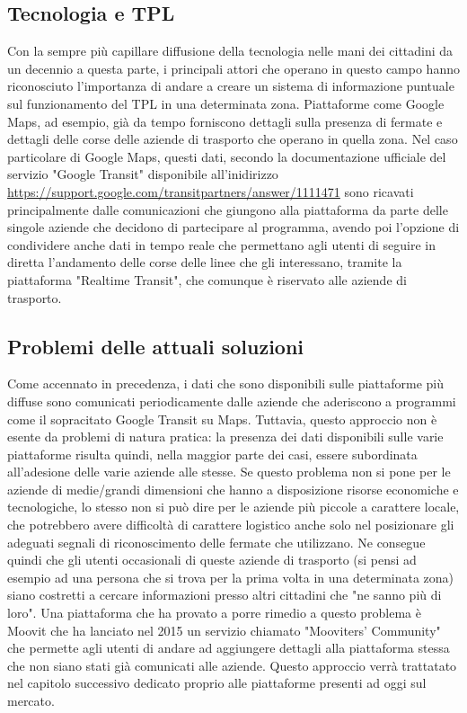     \subsection{Tecnologia e TPL}
    Con la sempre più capillare diffusione della tecnologia nelle mani dei cittadini da un decennio a questa parte, i principali attori che operano in questo campo hanno riconosciuto l'importanza di andare a creare un sistema di informazione puntuale sul funzionamento del TPL in una determinata zona. Piattaforme come Google Maps, ad esempio, già da tempo forniscono dettagli sulla presenza di fermate e dettagli delle corse delle aziende di trasporto che operano in quella zona. 
    Nel caso particolare di Google Maps, questi dati, secondo la documentazione ufficiale del servizio "Google Transit" disponibile all'inidirizzo \url{https://support.google.com/transitpartners/answer/1111471} sono ricavati principalmente dalle comunicazioni che giungono alla piattaforma da parte delle singole aziende che decidono di partecipare al programma, avendo poi l'opzione di condividere anche dati in tempo reale che permettano agli utenti di seguire in diretta l'andamento delle corse delle linee che gli interessano, tramite la piattaforma "Realtime Transit", che comunque è riservato alle aziende di trasporto.

    \subsection{Problemi delle attuali soluzioni}
    Come accennato in precedenza, i dati che sono disponibili sulle piattaforme più diffuse sono comunicati periodicamente dalle aziende che aderiscono a programmi come il sopracitato Google Transit su Maps. 
    Tuttavia, questo approccio non è esente da problemi di natura pratica: la presenza dei dati disponibili sulle varie piattaforme risulta quindi, nella maggior parte dei casi, essere subordinata all'adesione delle varie aziende alle stesse. Se questo problema non si pone per le aziende di medie/grandi dimensioni che hanno a disposizione risorse economiche e tecnologiche, lo stesso non si può dire per le aziende più piccole a carattere locale, che potrebbero avere difficoltà di carattere logistico anche solo nel posizionare gli adeguati segnali di riconoscimento delle fermate che utilizzano.
    Ne consegue quindi che gli utenti occasionali di queste aziende di trasporto (si pensi ad esempio ad una persona che si trova per la prima volta in una determinata zona) siano costretti a cercare informazioni presso altri cittadini che "ne sanno più di loro".
    Una piattaforma che ha provato a porre rimedio a questo problema è Moovit che ha lanciato nel 2015 un servizio chiamato "Mooviters' Community" che permette agli utenti di andare ad aggiungere dettagli alla piattaforma stessa che non siano stati già comunicati alle aziende. Questo approccio verrà trattatato nel capitolo successivo dedicato proprio alle piattaforme presenti ad oggi sul mercato. 

